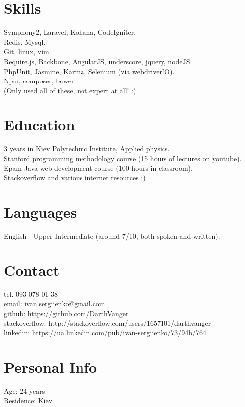 \documentclass[a4paper, 14pt]{article}
\begin{document}
\section{Skills}
    Symphony2, Laravel, Kohana, CodeIgniter. \\
    Redis, Mysql. \\
	Git, linux, vim. \\
    Require.js, Backbone, AngularJS, underscore, jquery, nodeJS. \\
    PhpUnit, Jasmine, Karma, Selenium (via webdriverIO). \\
    Npm, composer, bower. \\
    (Only used all of these, not expert at all! :) 
\section{Education}
	3 years in Kiev Polytechnic Institute, Applied physics. \\
	Stanford programming methodology course (15 hours of lectures on youtube). \\
	Epam Java web development course (100 hours in classroom). \\
	Stackoverflow and various internet resources :)
\section{Languages}
	English - Upper Intermediate (around 7/10, both spoken and written).
\section{Contact}
	tel. 093 078 01 38 \\
	email: ivan.sergiienko@gmail.com \\
    github: \url{https://github.com/DarthVanger} \\
    stackoverflow: \url{http://stackoverflow.com/users/1657101/darthvanger} \\
    linkedin: \url{https://ua.linkedin.com/pub/ivan-sergiienko/73/94b/764}
\section{Personal Info}
	Age: 24 years \\
	Residence: Kiev
\end{document}
